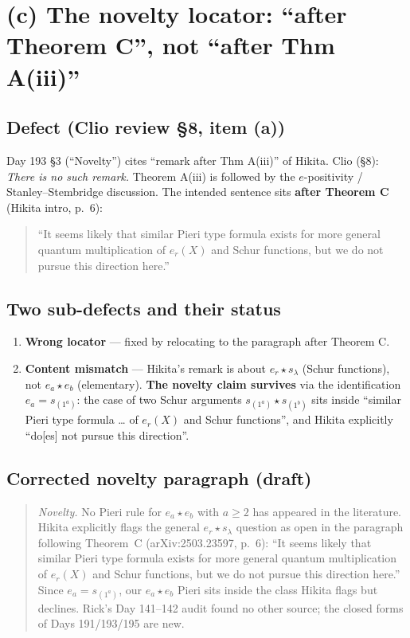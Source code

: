 \documentclass[11pt]{article}
\theoremstyle{definition}
\begin{document}
\section{(c) The novelty locator: ``after Theorem C'', not ``after Thm A(iii)''}
\label{sec:novelty}

\subsection*{Defect (Clio review \S8, item (a))}
Day 193 \S3 (``Novelty'') cites ``remark after Thm A(iii)'' of Hikita.
Clio (\S8): \emph{There is no such remark.} Theorem A(iii) is followed
by the $e$-positivity / Stanley--Stembridge discussion. The intended
sentence sits \textbf{after Theorem C} (Hikita intro, p.~6):
\begin{quote}
``It seems likely that similar Pieri type formula exists for more
general quantum multiplication of $e_r(X)$ and Schur functions, but we
do not pursue this direction here.''
\end{quote}

\subsection*{Two sub-defects and their status}
\begin{enumerate}[leftmargin=1.5em]
  \item \textbf{Wrong locator} --- fixed by relocating to the paragraph
        after Theorem C.
  \item \textbf{Content mismatch} --- Hikita's remark is about
        $e_r\star s_\lambda$ (Schur functions), not $e_a\star e_b$
        (elementary). \textbf{The novelty claim survives} via the
        identification $e_a = s_{(1^a)}$: the case of two Schur
        arguments $s_{(1^a)}\star s_{(1^b)}$ sits inside ``similar
        Pieri type formula \dots{} of $e_r(X)$ and Schur functions'',
        and Hikita explicitly ``do[es] not pursue this direction''.
\end{enumerate}

\subsection*{Corrected novelty paragraph (draft)}
\begin{quote}\small
\textit{Novelty.} No Pieri rule for $e_a\star e_b$ with $a\ge 2$ has
appeared in the literature. Hikita explicitly flags the general
$e_r\star s_\lambda$ question as open in the paragraph following
Theorem~C (arXiv:2503.23597, p.~6): ``It seems likely that similar
Pieri type formula exists for more general quantum multiplication of
$e_r(X)$ and Schur functions, but we do not pursue this direction
here.'' Since $e_a = s_{(1^a)}$, our $e_a\star e_b$ Pieri sits inside
the class Hikita flags but declines. Rick's Day 141--142 audit found
no other source; the closed forms of Days 191/193/195 are new.
\end{quote}
\end{document}
